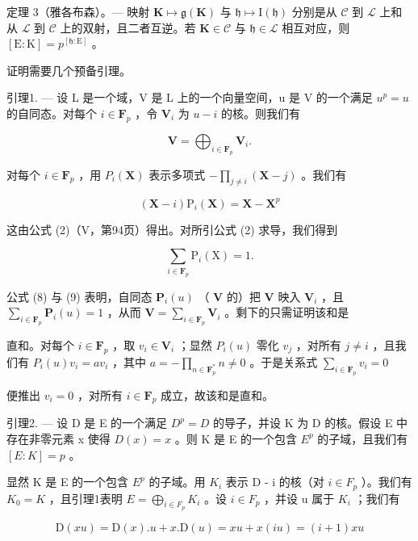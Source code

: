 定理 3（雅各布森）。--- 映射 \(\mathbf{K} \mapsto \mathfrak{g}(\mathbf{K})\) 与 \(\mathfrak{h} \mapsto \mathrm{I}(\mathfrak{h})\) 分别是从 \(\mathcal{C}\) 到 \(\mathcal{L}\) 上和从 \(\mathcal{L}\) 到 \(\mathcal{C}\) 上的双射，且二者互逆。若 \(\mathbf{K} \in \mathcal{C}\) 与 \(\mathfrak{h} \in \mathcal{L}\) 相互对应，则 \([\mathrm{E}:\mathrm{K}] = p^{[\mathfrak{h}:\mathrm{E}]}\) 。

证明需要几个预备引理。

引理1. --- 设 L 是一个域，V 是 L 上的一个向量空间，u 是 V 的一个满足 \(u^p = u\) 的自同态。对每个 \(i \in \mathbf{F}_p\) ，令 \(\mathbf{V}_i\) 为 \(u - i\) 的核。则我们有

\[
\mathbf {V} = \bigoplus_ {i \in \mathbf {F} _ {p}} \mathbf {V} _ {i}.
\]

对每个 \(i \in \mathbf{F}_p\) ，用 \(P_i(\mathbf{X})\) 表示多项式 \(-\prod_{j \neq i} (\mathbf{X} - j)\) 。我们有

\[
(\mathbf {X} - i) \mathrm{P} _ {i} (\mathbf {X}) = \mathbf {X} - \mathbf {X} ^ {p}\tag{8}
\]

这由公式 (2)（V，第94页）得出。对所引公式 (2) 求导，我们得到

\[
\sum_ {i \in \mathbf {F} _ {p}} \mathrm{P} _ {i} (\mathrm{X}) = 1.\tag{9}
\]

公式 (8) 与 (9) 表明，自同态 \(\mathbf{P}_i(u)\) （ \(\mathbf{V}\) 的）把 \(\mathbf{V}\) 映入 \(\mathbf{V}_i\) ，且 \(\sum_{i\in \mathbf{F}_p}\mathbf{P}_i(u) = 1\) ，从而 \(\mathbf{V} = \sum_{i\in \mathbf{F}_p}\mathbf{V}_i\) 。剩下的只需证明该和是

直和。对每个 \(i \in \mathbf{F}_p\) ，取 \(v_i \in \mathbf{V}_i\) ；显然 \(P_i(u)\) 零化 \(v_j\) ，对所有 \(j \neq i\) ，且我们有 \(P_i(u) v_i = av_i\) ，其中 \(a = -\prod_{n \in \mathbf{F}_p^*} n \neq 0\) 。于是关系式 \(\sum_{i \in \mathbf{F}_p} v_i = 0\)

便推出 \(v_{i} = 0\) ，对所有 \(i \in \mathbf{F}_p\) 成立，故该和是直和。

引理2. --- 设 D 是 E 的一个满足 \(D^{p} = D\) 的导子，并设 K 为 D 的核。假设 E 中存在非零元素 x 使得 \(D(x) = x\) 。则 K 是 E 的一个包含 \(E^{p}\) 的子域，且我们有 \([E : K] = p\) 。

显然 K 是 E 的一个包含 \(E^{p}\) 的子域。用 \(K_{i}\) 表示 D - i 的核（对 \(i \in F_{p}\) ）。我们有 \(K_{0} = K\) ，且引理1表明 \(E = \bigoplus_{i \in F_{p}} K_{i}\) 。设 \(i \in F_{p}\) ，并设 u 属于 \(K_{i}\) ；我们有

\[
\mathrm{D} (x u) = \mathrm{D} (x). u + x. \mathrm{D} (u) = x u + x (i u) = (i + 1) x u
\]


